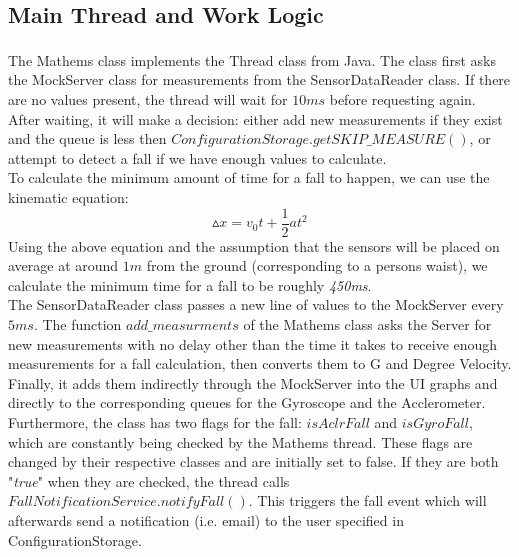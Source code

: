 \documentclass[hidelinks,conference,12pt]{IEEETran}
\begin{document}
\subsection{Main Thread and Work Logic}
The Mathems class implements the Thread\textsuperscript{\cite{thread}} class from Java. The class first asks the MockServer class for measurements from the SensorDataReader class. If there are no values present, the thread will wait for $10ms$ before requesting again. After waiting, it will make a decision: either add new measurements if they exist and the queue is less then $ConfigurationStorage.getSKIP\_MEASURE()$, or attempt to detect a fall if we have enough values to calculate. \\
To calculate the minimum amount of time for a fall to happen, we can use the kinematic equation:
$$ \vartriangle x = v_0t + \frac{1}{2}at^2 $$
Using the above equation and the assumption that the sensors will be placed on average at around $1m$ from the ground (corresponding to a persons waist), we calculate the minimum time for a fall to be roughly \textit{450ms}.\\ 
The SensorDataReader class passes a new line of values to the MockServer every $5ms$. The function $add\_measurments$ of the Mathems class asks the Server for new measurements with no delay other than the time it takes to receive enough measurements for a fall calculation, then converts them to G and Degree Velocity. Finally, it adds them indirectly through the MockServer into the UI graphs and directly to the corresponding queues for the Gyroscope and the Acclerometer.\\
Furthermore, the class has two flags for the fall: $isAclrFall$ and $isGyroFall$, which are constantly being checked by the Mathems thread. These flags are changed by their respective classes and are initially set to false. If they are both "\textit{true}" when they are checked, the thread calls $FallNotificationService.notifyFall()$. This triggers the fall event which will afterwards send a notification (i.e. email) to the user specified in ConfigurationStorage.
\end{document}
